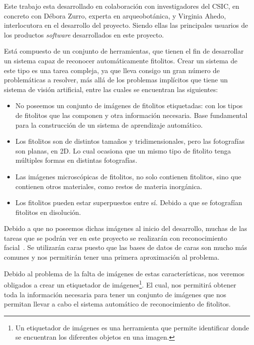 \label{intro}

Este trabajo esta desarrollado en colaboración con investigadores del CSIC, en concreto con Débora Zurro, experta en arqueobotánica, y Virginia Ahedo, interlocutora en el desarrollo del proyecto. Siendo ellas las principales usuarios de los productos \textit{software} desarrollados en este proyecto. 

Está compuesto de un conjunto de herramientas, que tienen el fin de desarrollar un sistema capaz de reconocer automáticamente fitolitos. Crear un sistema de este tipo es una tarea compleja, ya que lleva consigo un gran número de problemáticas a resolver, más allá de los problemas implícitos que tiene un sistema de visión artificial, entre las cuales se encuentran las siguientes:

\begin{itemize}
	\item No poseemos un conjunto de imágenes de fitolitos etiquetadas: con los tipos de fitolitos que las componen y otra información necesaria. Base fundamental para la construcción de un sistema de aprendizaje automático.
	\item Los fitolitos son de distintos tamaños y tridimensionales, pero las fotografías son planas, en 2D. Lo cual ocasiona que un mismo tipo de fitolito tenga múltiples formas en distintas fotografías.
	\item Las imágenes microscópicas de fitolitos, no solo contienen fitolitos, sino que contienen otros materiales, como restos de materia inorgánica.
	\item Los fitolitos pueden estar superpuestos entre sí. Debido a que se fotografían fitolitos en disolución.
\end{itemize}

Debido a que no poseemos dichas imágenes al inicio del desarrollo, muchas de las tareas que se podrán ver en este proyecto se realizarán con reconocimiento facial~\cite{facedetection}. Se utilizarán caras puesto que las bases de datos de caras son mucho más comunes y nos permitirán tener una primera aproximación al problema.

Debido al problema de la falta de imágenes de estas características, nos veremos obligados a crear un etiquetador de imágenes\footnote{Un etiquetador de imágenes es una herramienta que permite identificar donde se encuentran los diferentes objetos en una imagen.}. El cual, nos permitirá obtener toda la información necesaria para tener un conjunto de imágenes que nos permitan llevar a cabo el sistema automático de reconocimiento de fitolitos.

